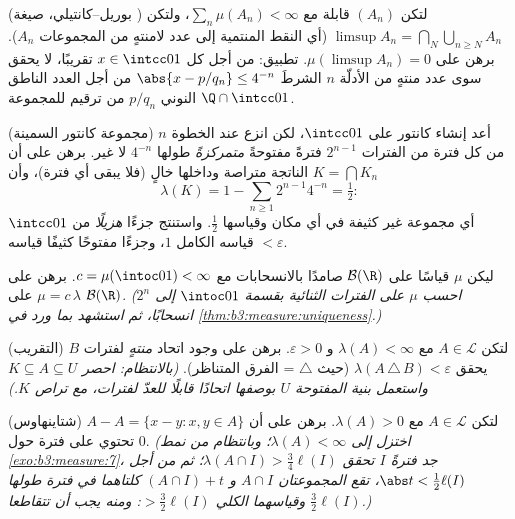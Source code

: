 \begin{exercise}[$\star\star$]\label{exo:b3:measure:4}
(بوريل--كانتيلي، صيغة ) لتكن $(A_n)$ قابلة  مع
$\sum_n\mu(A_n) < \infty$، ولتكن $\limsup A_n =
\bigcap_N\bigcup_{n\geq N}A_n$ (أي النقط المنتمية إلى عدد لامنتهٍ من
المجموعات $A_n$). برهن على $\mu(\limsup A_n) = 0$. تطبيق: من أجل كل
$x \in \intcc01$ تقريبًا، لا يحقق سوى عدد منتهٍ من الأدلّة $n$
الشرطَ $\abs{x - p/q_n} \leq 4^{-n}$ من أجل العدد الناطق النوني $p/q_n$ من ترقيم
للمجموعة $\Q\cap\intcc01$.
\end{exercise}

\begin{exercise}[$\star\star$]\label{exo:b3:measure:5}
(مجموعة كانتور السمينة) أعد إنشاء كانتور على $\intcc01$، لكن
انزع عند الخطوة $n$ من كل فترة من الفترات $2^{n-1}$ فترةً
مفتوحةً \emph{متمركزةً} طولها $4^{-n}$ لا غير. برهن على أن
$K = \bigcap K_n$ الناتجة متراصة وداخلها خالٍ (فلا يبقى أي فترة)، وأن
\[
\lambda(K) = 1 - \sum_{n\geq1}2^{n-1}4^{-n} = \tfrac12 :
\]
أي مجموعة غير كثيفة في أي مكان وقياسها $\frac12$. واستنتج جزءًا
\emph{هزيلًا} من $\intcc01$ قياسه الكامل $1$، وجزءًا مفتوحًا
كثيفًا قياسه $< \varepsilon$.
\end{exercise}

\begin{exercise}[$\star\star$]\label{exo:b3:measure:6}
ليكن $\mu$ قياسًا على $\mathcal B(\R)$ صامدًا بالانسحابات مع
$c = \mu(\intoc01) < \infty$. برهن على $\mu =
c\,\lambda$ على $\mathcal B(\R)$. \emph{(احسب
$\mu$ على الفترات الثنائية بقسمة $\intoc01$ إلى $2^n$ انسحابًا،
ثم استشهد بما ورد في \cref{thm:b3:measure:uniqueness}.)}
\end{exercise}

\begin{exercise}[$\star\star$]\label{exo:b3:measure:7}
(التقريب) لتكن $A \in \mathcal L$ مع $\lambda(A) <
\infty$ و $\varepsilon > 0$. برهن على وجود
اتحاد \emph{منتهٍ} لفترات $B$ يحقق $\lambda(A\,\triangle\,B) <
\varepsilon$ (حيث $\triangle$ =
الفرق المتناظر). \emph{(بالانتظام: احصر $K \subseteq A \subseteq U$ واستعمل بنية
المفتوحة $U$ بوصفها اتحادًا قابلًا للعدّ لفترات، مع تراص $K$.)}
\end{exercise}

\begin{exercise}[$\star\star\star$]\label{exo:b3:measure:8}
(شتاينهاوس) لتكن $A \in \mathcal L$ مع $\lambda(A) > 0$. برهن على أن $A - A = \{x - y : x, y \in A\}$
تحتوي على فترة حول $0$. \emph{(اختزل إلى $\lambda(A) < \infty$؛ وبانتظام من
نمط \cref{exo:b3:measure:7}، جد فترةً $I$ تحقق $\lambda(A \cap I) > \frac34\ell(I)$؛ ثم من أجل $\abs t <
\frac12\ell(I)$،
تقع المجموعتان $A\cap I$ و $(A\cap I) + t$ كلتاهما في فترة طولها
$\frac32\ell(I)$ وقياسهما الكلي $> \frac32\ell(I)$: ومنه يجب أن تتقاطعا.)}
\end{exercise}

